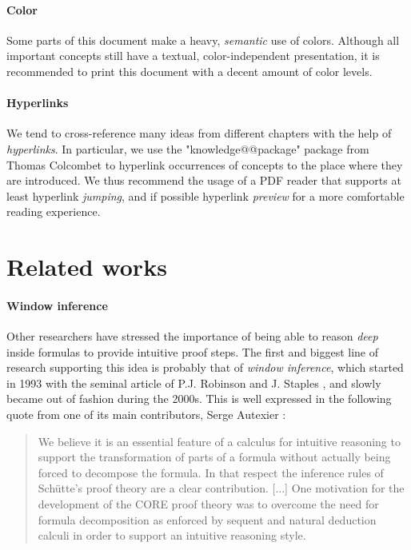 \paragraph{Color}

Some parts of this document make a heavy, \emph{semantic} use of colors.
Although all important concepts still have a textual, color-independent
presentation, it is recommended to print this document with a decent amount of
color levels.

\paragraph{Hyperlinks}
  
We tend to cross-reference many ideas from different chapters with the help of
\emph{hyperlinks}. In particular, we use the "knowledge@@package" package from
Thomas Colcombet to hyperlink occurrences of concepts to the place where they
are introduced. We thus recommend the usage of a PDF reader that supports at
least hyperlink \emph{jumping}, and if possible hyperlink \emph{preview} for a
more comfortable reading experience.


\section{Related works}

\paragraph{Window inference}

Other researchers have stressed the importance of being able to reason
\emph{deep} inside formulas to provide intuitive proof steps. The first and
biggest line of research supporting this idea is probably that of \emph{window
inference}, which started in 1993 with the seminal article of P.J. Robinson and
J. Staples , and slowly became out of
fashion during the 2000s. This is well expressed in the following quote from one
of its main contributors, Serge Autexier :

\begin{quote}
We believe it is an essential feature of a calculus for intuitive reasoning to
support the transformation of parts of a formula without actually being forced
to decompose the formula. In that respect the inference rules of Schütte's proof
theory are a clear contribution. [...] One motivation for the development of the
CORE proof theory was to overcome the need for formula decomposition as enforced
by sequent and natural deduction calculi in order to support an intuitive
reasoning style.
\end{quote}

